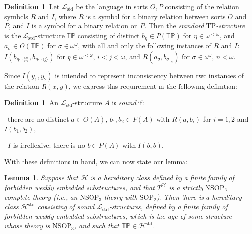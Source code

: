\documentclass{amsart}
\newtheorem{lemma}[theorem]{Lemma}
\theoremstyle{definition}
\newtheorem{definition}[theorem]{Definition}
\theoremstyle{remark}
\numberwithin{equation}{section}
\begin{document}
\begin{definition}
  \label{standard tp-structure}  Let $\mathcal{L}_{\mathrm{std}}$ be the language in sorts $O, P$ consisting of the relation symbols $R$ and $I$, where $R$ is a symbol for a binary relation between sorts $O$ and $P$, and $I$ is a symbol for a binary relation on $P$. Then the \textit{standard $\mathrm{TP}$-structure} is the $\mathcal{L}_{\mathrm{std}}$-structure $\mathbb{TP}$ consisting of distinct $b_{\eta} \in P(\mathbb{TP})$ for $\eta \in \omega^{< \omega}$, and $a_{\sigma} \in O(\mathbb{TP})$ for $\sigma \in \omega^{\omega}$, with all and only the following instances of $R$ and $I$: $I(b_{\eta \smallfrown \langle i \rangle},b_{\eta \smallfrown \langle j \rangle})$ for $\eta \in \omega^{< \omega}$, $i < j < \omega$, and $R(a_{\sigma}, b_{\sigma|_{n}} )$ for $\sigma \in \omega^{\omega}$, $n < \omega$.
\end{definition}

Since $I(y_{1}, y_{2})$ is intended to represent inconsistency between two instances of the relation $R(x, y)$, we express this requirement in the following definition:

\begin{definition}
    \label{sound structure} An $\mathcal{L}_{\mathrm{std}}$-structure $A$ is \textit{sound} if:
    
    --there are no distinct $a \in O(A)$, $b_1, b_2 \in P(A)$ with $R(a, b_i)$ for $i = 1, 2$ and $I(b_1,b_2)$, 
    
    --$I$ is irreflexive: there is no $b \in P(A)$ with $I(b, b)$.
\end{definition}
With these definitions in hand, we can now state our lemma:


\begin{lemma}
 \label{standard hereditary class}   Suppose that $\mathcal{H}$ is a hereditary class defined by a finite family of forbidden weakly embedded substructures, and that  $T^{\mathcal{H}}$ is a strictly $\mathrm{NSOP}_{3}$ complete theory (i.e., an $\mathrm{NSOP}_{3}$ theory with $\mathrm{SOP}_{2}$). Then there is a hereditary class $\mathcal{H}^{\mathrm{std}}$ consisting of sound $\mathcal{L}_{\mathrm{std}}$-structures, defined by a finite family of forbidden weakly embedded substructures, which is the age of some structure whose theory is $\mathrm{NSOP}_{3}$, and such that $\mathbb{TP} \in \mathcal{H}^{\mathrm{std}}$.
\end{lemma}
\end{document}
